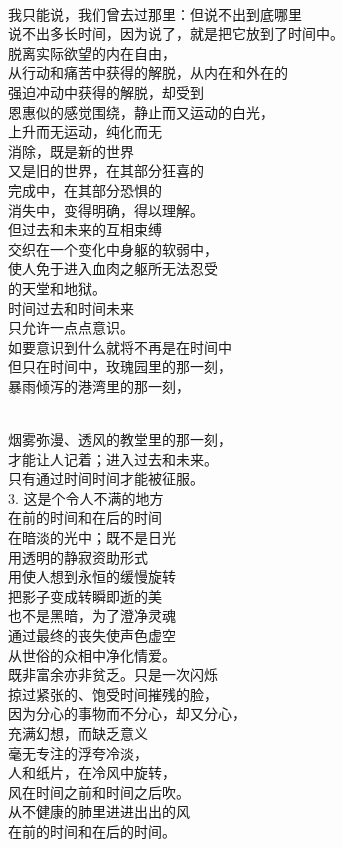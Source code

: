 \documentclass{article}
\begin{document}
\newpage 


\\
我只能说，我们曾去过那里：但说不出到底哪里\\
说不出多长时间，因为说了，就是把它放到了时间中。\\
脱离实际欲望的内在自由，\\
从行动和痛苦中获得的解脱，从内在和外在的\\
强迫冲动中获得的解脱，却受到\\
恩惠似的感觉围绕，静止而又运动的白光，\\
上升而无运动，纯化而无\\
消除，既是新的世界\\
又是旧的世界，在其部分狂喜的\\
完成中，在其部分恐惧的\\
消失中，变得明确，得以理解。\\
但过去和未来的互相束缚\\
交织在一个变化中身躯的软弱中，\\
使人免于进入血肉之躯所无法忍受\\
的天堂和地狱。\\
时间过去和时间未来\\
只允许一点点意识。\\
如要意识到什么就将不再是在时间中\\
但只在时间中，玫瑰园里的那一刻，\\
暴雨倾泻的港湾里的那一刻，

\newpage 


\\
烟雾弥漫、透风的教堂里的那一刻，\\
才能让人记着；进入过去和未来。\\
只有通过时间时间才能被征服。\\
3. 这是个令人不满的地方\\
在前的时间和在后的时间\\
在暗淡的光中；既不是日光\\
用透明的静寂资助形式\\
用使人想到永恒的缓慢旋转\\
把影子变成转瞬即逝的美\\
也不是黑暗，为了澄净灵魂\\
通过最终的丧失使声色虚空\\
从世俗的众相中净化情爱。\\
既非富余亦非贫乏。只是一次闪烁\\
掠过紧张的、饱受时间摧残的脸，\\
因为分心的事物而不分心，却又分心，\\
充满幻想，而缺乏意义\\
毫无专注的浮夸冷淡，\\
人和纸片，在冷风中旋转，\\
风在时间之前和时间之后吹。\\
从不健康的肺里进进出出的风\\
在前的时间和在后的时间。
\end{document}
